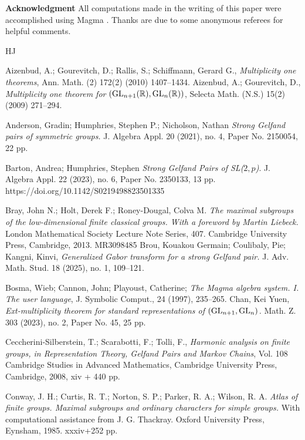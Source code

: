 \documentclass{amsart}
\begin{document}
\noindent
{\bf Acknowledgment} All computations made in the writing of this paper were accomplished  using Magma \cite{Mag}. Thanks are due to some anonymous referees for helpful comments.


\begin{thebibliography}{HJ}

 Aizenbud, A.; Gourevitch, D.; Rallis, S.; Schiffmann, Gerard G., \emph{Multiplicity one theorems}, Ann. Math. (2) 172(2) (2010) 1407--1434.
 Aizenbud, A.; Gourevitch, D., \emph{Multiplicity one theorem for $({\rm GL}_{n+1} (\mathbb R), {\rm GL}_n (\mathbb R))$}, Selecta Math. (N.S.) 15(2) (2009) 271--294.

 Anderson, Gradin; Humphries, Stephen P.; Nicholson, Nathan \emph{Strong Gelfand pairs of symmetric groups.}
J. Algebra Appl. 20 (2021), no. 4, Paper No. 2150054, 22 pp.

  Barton, Andrea; Humphries, Stephen \emph{Strong Gelfand Pairs of {\rm SL}($2,p$)}. J. Algebra Appl. 22 (2023), no. 6, Paper No. 2350133, 13 pp.  https://doi.org/10.1142/S0219498823501335


 Bray, John N.; Holt, Derek F.; Roney-Dougal, Colva M. \emph{The maximal subgroups of the low-dimensional finite classical groups. With a foreword by Martin Liebeck.} London Mathematical Society Lecture Note Series, 407. Cambridge University Press, Cambridge, 2013. MR3098485
 Brou, Kouakou Germain; Coulibaly, Pie; Kangni, Kinvi, 
\emph{Generalized Gabor transform for a strong Gelfand pair.} J. Adv. Math. Stud. 18 (2025), no. 1, 109--121.



  Bosma, Wieb; Cannon, John;    Playoust, Catherine; \emph{The Magma algebra system. I. The user language}, J. Symbolic Comput., 24 (1997), 235--265.
 Chan, Kei Yuen,   \emph{Ext-multiplicity theorem for standard representations of $({\rm GL}_{n+1},{\rm GL}_{n})$.} Math. Z. 303 (2023), no. 2, Paper No. 45, 25 pp.

 Ceccherini-Silberstein, T.; Scarabotti, F.; Tolli, F., \emph{Harmonic analysis on finite groups, in Representation Theory, Gelfand Pairs and Markov Chains}, Vol. 108 Cambridge Studies in Advanced Mathematics, Cambridge University Press, Cambridge, 2008, xiv + 440 pp.

 Conway, J. H.; Curtis, R. T.; Norton, S. P.; Parker, R. A.; Wilson, R. A. \emph{Atlas of finite groups. Maximal subgroups and ordinary characters for simple groups.} With computational assistance from J. G. Thackray. Oxford University Press, Eynsham, 1985. xxxiv+252 pp.


\end{thebibliography}
\end{document}
